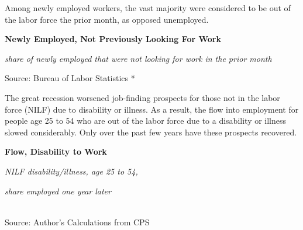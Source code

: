 \documentclass{report}
\makeatletter
\newcommand{\tbllink}[1]{\href{https://raw.githubusercontent.com/bdecon/US-chartbook/master/chartbook/data/#1}{\faTable}}
\newcommand*\short[1]{\expandafter\@gobbletwo\number\numexpr#1\relax}
\newcommand{\dateaxisticks}{
		date coordinates in=x, axis line style={draw=none},
		xmax={2020-10-01},
		max space between ticks=40,	    
		xtick={{1990-01-01}, {1992-01-01}, {1994-01-01}, 
			{1996-01-01}, {1998-01-01}, {2000-01-01}, 
			{2002-01-01}, {2004-01-01}, {2006-01-01},
			{2008-01-01}, {2010-01-01}, {2012-01-01}, {2014-01-01},
		    {2016-01-01}, {2018-01-01}, {2020-01-01}},
		minor xtick={{1989-01-01}, {1991-01-01}, {1993-01-01},
			{1995-01-01}, {1997-01-01}, {1999-01-01}, 
			{2001-01-01}, {2003-01-01}, {2005-01-01}, {2007-01-01},
		    {2009-01-01}, {2011-01-01}, {2013-01-01}, {2015-01-01},
		    {2017-01-01}, {2019-01-01}},
		enlarge y limits={0.06}, enlarge x limits={0.01},
		}
\newcommand{\shdateaxisticks}{
		date coordinates in=x, axis line style={draw=none},
		xmax={2020-11-15},
		max space between ticks=40,	    
		xtick={{1990-01-01}, {1995-01-01}, {2000-01-01}, 
			{2005-01-01}, {2010-01-01}, {2015-01-01}, {2020-01-01}},
		minor xtick={},
		enlarge y limits={0.06}, enlarge x limits={0.01},
		}
\newcommand{\bbar}[2]{extra #1 ticks = {{#2}}, extra #1 tick labels = ,
		extra #1 tick style = {grid=major, grid style={thick, black!25}},}
\newcommand{\stdline}[4]{\addplot[very thick, no markers, color=#1] 
		table [x=#2, y=#3, col sep=comma] {#4};	}
\newcommand{\rbars}{
		\fill[color=black!10] (axis cs:{1990-07-01},\pgfkeysvalueof{/pgfplots/ymin}) rectangle 
			(axis cs:{1991-03-01}, \pgfkeysvalueof{/pgfplots/ymax});
		\fill[color=black!10] (axis cs:{2007-12-01},\pgfkeysvalueof{/pgfplots/ymin}) rectangle 
			(axis cs:{2009-07-01}, \pgfkeysvalueof{/pgfplots/ymax});
		\fill[color=black!10] (axis cs:{2001-03-01},\pgfkeysvalueof{/pgfplots/ymin}) rectangle 
			(axis cs:{2001-11-01}, \pgfkeysvalueof{/pgfplots/ymax});
		\fill[color=black!10] (axis cs:{2020-02-01},\pgfkeysvalueof{/pgfplots/ymin}) rectangle 
			(axis cs:{2020-10-01}, \pgfkeysvalueof{/pgfplots/ymax});}
\newcommand{\rebars}{
		\fill[color=black!10] (axis cs:{2007-12-01},\pgfkeysvalueof{/pgfplots/ymin}) rectangle 
			(axis cs:{2009-07-01}, \pgfkeysvalueof{/pgfplots/ymax});
		\fill[color=black!10] (axis cs:{2001-03-01},\pgfkeysvalueof{/pgfplots/ymin}) rectangle 
			(axis cs:{2001-11-01}, \pgfkeysvalueof{/pgfplots/ymax});
		\fill[color=black!10] (axis cs:{2020-02-01},\pgfkeysvalueof{/pgfplots/ymin}) rectangle 
			(axis cs:{2020-10-01}, \pgfkeysvalueof{/pgfplots/ymax});}
\makeatother
\begin{document}
{{{{{{{{{\begin{minipage}{0.76\textwidth}
Among newly employed workers, the vast majority were considered to be out of the labor force the prior month, as opposed unemployed.  

\vspace{4mm}

\normalsize \textbf{Newly Employed, Not Previously Looking For Work}

\footnotesize{\textit{share of newly employed that were not looking for work in the prior month}}

\hspace*{-2mm} 

\footnotesize{Source: Bureau of Labor Statistics} \hfill \tbllink{lf_flow.csv}*

\end{minipage}

\vspace{5mm}

\begin{minipage}{0.32\textwidth}
\small The great recession worsened job-finding prospects for those not in the labor force (NILF) due to disability or illness. As a result, the flow into employment for people age 25 to 54 who are out of the labor force due to a disability or illness slowed considerably. Only over the past few years have these prospects recovered. 
\end{minipage} \hspace{5mm} \begin{minipage}{0.4\textwidth}
\normalsize \textbf{Flow, Disability to Work}

\footnotesize{\textit{NILF disability/illness, age 25 to 54,}}

\footnotesize{\textit{share employed one year later}}

\hspace*{-2mm} \\
\footnotesize{Source: Author's Calculations from CPS} \hfill \tbllink{disflow.csv}
\end{minipage}

}}}}}}}}}
\end{document}
